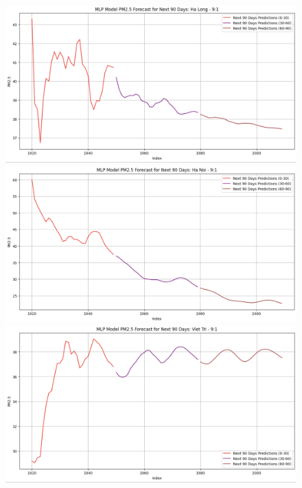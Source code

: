 \begin{figure}[H]
    \begin{minipage}{0.15\textwidth}
        \centering
        \includegraphics[width=1\textwidth]{img/final/MLP/90D/MLP_9_1_HL_90D.png}
        \end{minipage}
        \hfill
        \begin{minipage}{0.15\textwidth}
        \centering
        \includegraphics[width=1\textwidth]{img/final/MLP/90D/MLP_9_1_HN_90D.png}
        \end{minipage}
        \hfill
        \begin{minipage}{0.15\textwidth}
        \centering
        \includegraphics[width=1\textwidth]{img/final/MLP/90D/MLP_9_1_VT_90D.png}
        \end{minipage}
        \hfill


\end{figure}
